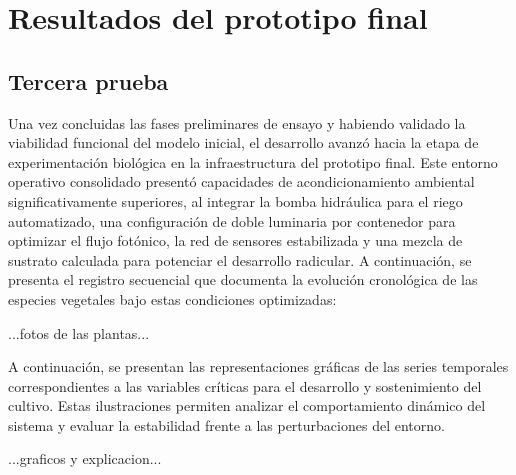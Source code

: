 \section{Resultados del prototipo final}

\subsection{Tercera prueba}
Una vez concluidas las fases preliminares de ensayo y habiendo validado la viabilidad funcional del modelo inicial, el desarrollo avanzó hacia la etapa de experimentación biológica en la infraestructura del prototipo final. Este entorno operativo consolidado presentó capacidades de acondicionamiento ambiental significativamente superiores, al integrar la bomba hidráulica para el riego automatizado, una configuración de doble luminaria por contenedor para optimizar el flujo fotónico, la red de sensores estabilizada y una mezcla de sustrato calculada para potenciar el desarrollo radicular. A continuación, se presenta el registro secuencial que documenta la evolución cronológica de las especies vegetales bajo estas condiciones optimizadas:

...fotos de las plantas...

A continuación, se presentan las representaciones gráficas de las series temporales correspondientes a las variables críticas para el desarrollo y sostenimiento del cultivo. Estas ilustraciones permiten analizar el comportamiento dinámico del sistema y evaluar la estabilidad frente a las perturbaciones del entorno.

...graficos y explicacion...
